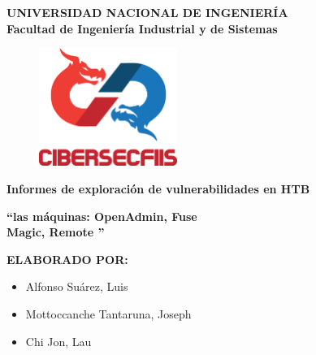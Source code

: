 \begin{titlepage}
	
	
	\begin{center}
		{\LARGE \textbf{UNIVERSIDAD NACIONAL DE INGENIERÍA}}\\
		\vspace{5 mm}
		{\large \textbf{Facultad de Ingeniería Industrial y de Sistemas}}\\
		\vspace{6.5 mm}
		\begin{figure}[h]
			\centering 
			\includegraphics[width=0.4\textwidth]{images/CiberSecFIIS.png}
		\end{figure}
		\vspace{4 mm}	
		{\Large \textbf{Informes de exploración de vulnerabilidades en HTB} }\\
		\vspace{5 mm}
		
		\onehalfspacing  %
		{\Large \textbf{``{\@De las máquinas: OpenAdmin, Fuse \\Magic, Remote }''} }\\
		
		\singlespacing  %
		
		\vspace{4 mm}	

		\vspace{10 mm}
		{\large \textbf{ELABORADO POR:} }\\
		\vspace{10 mm}
		\begin{center}
			\begin{minipage}{0.7\textwidth}
			  \begin{itemize}
				\item \Large Alfonso Suárez, Luis
				\item \Large Mottoccanche Tantaruna, Joseph
				\item \Large Chi Jon, Lau
			  \end{itemize}
			\end{minipage}
		  \end{center}

		\vspace{5 mm}	
	\end{center}

\end{titlepage}
